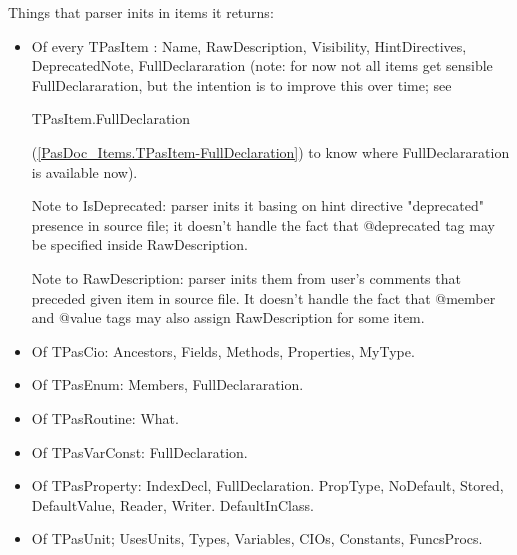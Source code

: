 \documentclass{report}
\begin{document}
Things that parser inits in items it returns:

\begin{itemize}
\item Of every TPasItem : Name, RawDescription, Visibility, HintDirectives, DeprecatedNote, FullDeclararation (note: for now not all items get sensible FullDeclararation, but the intention is to improve this over time; see \begin{ttfamily}TPasItem.FullDeclaration\end{ttfamily}(\ref{PasDoc_Items.TPasItem-FullDeclaration}) to know where FullDeclararation is available now).

Note to IsDeprecated: parser inits it basing on hint directive "deprecated" presence in source file; it doesn't handle the fact that @deprecated tag may be specified inside RawDescription.

Note to RawDescription: parser inits them from user's comments that preceded given item in source file. It doesn't handle the fact that @member and @value tags may also assign RawDescription for some item.
\item Of TPasCio: Ancestors, Fields, Methods, Properties, MyType.
\item Of TPasEnum: Members, FullDeclararation.
\item Of TPasRoutine: What.
\item Of TPasVarConst: FullDeclaration.
\item Of TPasProperty: IndexDecl, FullDeclaration. PropType, NoDefault, Stored, DefaultValue, Reader, Writer. DefaultInClass.
\item Of TPasUnit; UsesUnits, Types, Variables, CIOs, Constants, FuncsProcs.
\end{itemize}
\end{document}
